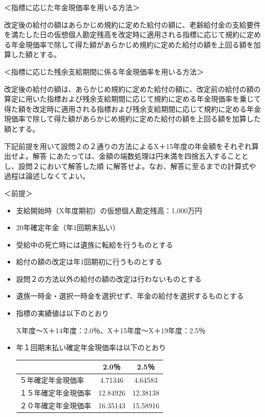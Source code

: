 \begin{answerbox}
  ＜指標に応じた年金現価率を用いる方法＞

改定後の給付の額はあらかじめ規約に定めた給付の額に、老齢給付金の支給要件を満たした日の仮想個人勘定残高を改定時に適用される指標に応じて規約に定める年金現価率で除して得た額があらかじめ規約に定めた給付の額を上回る額を加算した額とする。

＜指標に応じた残余支給期間に係る年金現価率を用いる方法＞

改定後の給付の額は、あらかじめ規約に定めた給付の額に、改定前の給付の額の算定に用いた指標および残余支給期間に応じて規約に定める年金現価率を乗じて得た額を改定時に適用される指標および残余支給期間に応じて規約に定める年金現価率で除して得た額があらかじめ規約に定めた給付の額を上回る額を加算した額とする。
\end{answerbox}

\begin{shortanswer}[数理人試験 H28 問題3 設問3]
  下記前提を用いて設問２の２通りの方法によるX＋15年度の年金額をそれぞれ算出せよ。解答
にあたっては、金額の端数処理は円未満を四捨五入することとし、設問２において解答した順
に解答せよ。なお、解答に至るまでの計算式や過程は論述しなくてよい。

＜前提＞
\begin{itemize}
  \item 支給開始時（X年度期初）の仮想個人勘定残高：1,000万円
  \item 20年確定年金（年1回期末払い）
  \item 受給中の死亡時には遺族に転給を行うものとする
  \item 給付の額の改定は年1回期初に行うものとする
  \item 設問２の方法以外の給付の額の改定は行わないものとする
  \item 遺族一時金・選択一時金を選択せず、年金の給付を選択するものとする
  \item 指標の実績値は以下のとおり
  
  \begin{center}
    X年度～X＋14年度：2.0％、X＋15年度～X＋19年度：2.5％
  \end{center}

  \item 年１回期末払い確定年金現価率は以下のとおり
  
  \begin{table}[htbp]
    \centering
    \begin{tabular}{|l|c|c|} \hline
      & 2.0％ & 2.5％ \\ \hline
      ５年確定年金現価率 & 4.71346 & 4.64583 \\ \hline
      １５年確定年金現価率 & 12.84926 & 12.38138 \\ \hline 
      ２０年確定年金現価率 & 16.35143 & 15.58916 \\ \hline
    \end{tabular}
  \end{table}
\end{itemize}
\end{shortanswer}

